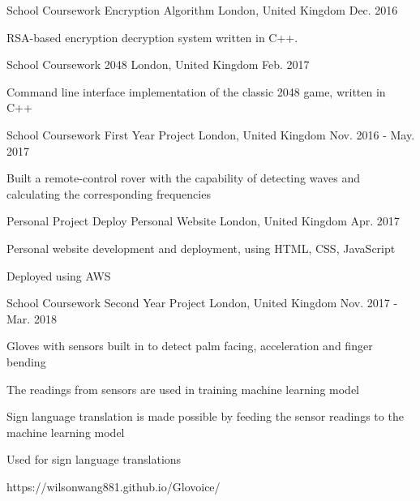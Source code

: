 
\begin{cventries}
  \cventry
    {School Coursework} %
    {Encryption Algorithm} %
    {London, United Kingdom} %
    {Dec. 2016} %
    {
      \begin{cvitems} %
        \item {RSA-based encryption decryption system written in C++.}
      \end{cvitems}
    }
    
    \cventry
    {School Coursework} %
    {2048} %
    {London, United Kingdom} %
    {Feb. 2017} %
    {
      \begin{cvitems} %
        \item {Command line interface implementation of the classic 2048 game, written in C++}
      \end{cvitems}
    }
    
    \cventry
    {School Coursework} %
    {First Year Project} %
    {London, United Kingdom} %
    {Nov. 2016 - May. 2017} %
    {
      \begin{cvitems} %
        \item {Built a remote-control rover with the capability of detecting waves
        and calculating the corresponding frequencies}
      \end{cvitems}
    }
    
    \cventry
    {Personal Project} %
    {Deploy Personal Website} %
    {London, United Kingdom} %
    {Apr. 2017} %
    {
      \begin{cvitems} %
        \item {Personal website development and deployment, using HTML, CSS, JavaScript}
        \item {Deployed using AWS}
      \end{cvitems}
    }
    
    \cventry
    {School Coursework} %
    {Second Year Project} %
    {London, United Kingdom} %
    {Nov. 2017 - Mar. 2018} %
    {
      \begin{cvitems} %
        \item {Gloves with sensors built in to detect palm facing, acceleration and finger bending}
        \item {The readings from sensors are used in training machine learning model}
        \item {Sign language translation is made possible by feeding the sensor readings to the machine learning model}
        \item {Used for sign language translations}
        \item {https://wilsonwang881.github.io/Glovoice/}
      \end{cvitems}
    }
    

\end{cventries}
